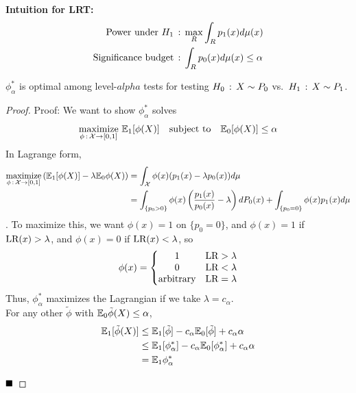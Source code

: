 \textbf{Intuition for LRT:}
\begin{align*}
    \tt{Power under } H_1 &\col \max_{R} \int_{R} p_1(x) d\mu(x)\\
    \tt{Significance budget} &\col \int_{R} p_0(x) d\mu(x) \leq \alpha
\end{align*}

\begin{theorem}
    $\phi_{\alpha}^{*}$ is optimal among level-$alpha$ tests for testing $H_0 \col X \sim P_0$ vs.\ $H_1 \col X \sim P_1$.
\end{theorem}
\begin{proof}{Proof:}
    We want to show $\phi_{\alpha}^{*}$ solves
    \[ \underset{\phi \col \cal{X} \to [0, 1]}{\tt{maximize}}\ \E_1[\phi(X)] \quad \tt{subject to} \quad \E_0[\phi(X)] \leq \alpha \]
    In Lagrange form,
    \begin{align*}
        \underset{\phi \col \cal{X} \to [0, 1]}{\tt{maximize}}\left(\E_1[\phi(X)] - \lambda\E_0\phi(X)\right) &= \int_{\cal{X}} \phi(x)(p_1(x) - \lambda p_0(x)) d\mu\\
        &= \int_{\{p_0 > 0\}} \phi(x)\left(\frac{p_1(x)}{p_0(x)} - \lambda\right) dP_0(x) + \int_{\{p_0 = 0\}} \phi(x)p_1(x) d\mu
    \end{align*}.
    To maximize this, we want $\phi(x) = 1$ on $\{p_0 = 0\}$, and $\phi(x) = 1$ if $\tt{LR}(x) > \lambda$, and $\phi(x) = 0$ if $\tt{LR}(x) < \lambda$, so
    \[ \phi(x) = \left\{\begin{matrix} 1 & \tt{LR} > \lambda \\ 0 & \tt{LR} < \lambda \\ \tt{arbitrary} & \tt{LR} = \lambda \end{matrix}\right. \]
    Thus, $\phi_{\alpha}^{*}$ maximizes the Lagrangian if we take $\lambda = c_{\alpha}$.\\

    For any other $\tilde{\phi}$ with $\E_0\tilde{\phi}(X) \leq \alpha$,
    \begin{align*}
        \E_1[\tilde{\phi}(X)] &\leq \E_1[\tilde{\phi}] - c_{\alpha}\E_0[\tilde{\phi}] + c_{\alpha}\alpha\\
        &\leq \E_1[\phi_{\alpha}^{*}] - c_{\alpha}\E_0[\phi_{\alpha}^{*}] + c_{\alpha}\alpha\\
        &= \E_1\phi_{\alpha}^{*}
    \end{align*}

    $\qed$
\end{proof}

